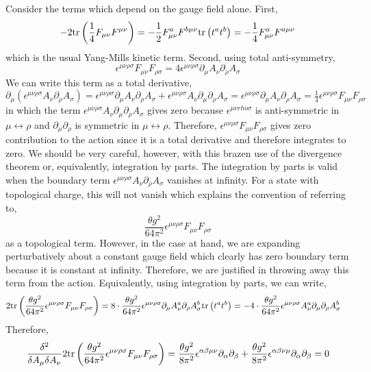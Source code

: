\documentclass[12pt]{article}
\begin{document}
Consider the terms which depend on the gauge field alone. First,
\[ - 2 \mathrm{tr} \left(  \frac{1}{4} F_{\mu \nu} F^{\mu \nu} \right) = -\frac{1}{2} F_{\mu\nu}^a F^{b \mu \nu} \mathrm{tr} \left( t^a t^b \right) = - \frac{1}{4} F_{\mu \nu}^a F^{a \mu \nu}  \]
which is the usual Yang-Mills kinetic term. 
Second, using total anti-symmetry,
\[ \epsilon^{\mu \nu \rho \sigma} F_{\mu \nu} F_{\rho \sigma} = 4 \epsilon^{\mu \nu \rho \sigma} \partial_\mu A_{\nu} \partial_\rho A_\sigma \]
We can write this term as a total derivative,
\[  \partial_\mu \left( \epsilon^{\mu \nu \rho \sigma} A_{\nu} \partial_\rho A_\sigma \right) =  \epsilon^{\mu \nu \rho \sigma} \partial_\mu A_{\nu} \partial_\rho A_\sigma + \epsilon^{\mu \nu \rho \sigma} A_{\nu} \partial_\mu \partial_\rho A_\sigma = \epsilon^{\mu \nu \rho \sigma} \partial_\mu A_{\nu} \partial_\rho A_\sigma = \tfrac{1}{4} \epsilon^{\mu \nu \rho \sigma} F_{\mu \nu} F_{\rho \sigma} \]
in which the term $\epsilon^{\mu \nu \rho \sigma} A_{\nu} \partial_\mu \partial_\rho A_\sigma$ gives zero because $\epsilon^{\mu \nu rho \sigma}$ is anti-symmetric in $\mu \leftrightarrow \rho$ and $\partial_\mu \partial_\rho$ is symmetric in $\mu \leftrightarrow \rho$. Therefore, $\epsilon^{\mu \nu \rho \sigma} F_{\mu \nu} F_{\rho \sigma}$ gives zero contribution to the action since it is a total derivative and therefore integrates to zero. We should be very careful, however, with this brazen use of the divergence theorem or, equivalently, integration by parts. The integration by parts is valid when the boundary term $\epsilon^{\mu \nu \rho \sigma} A_\nu \partial_\rho A_\sigma$ vanishes at infinity. For a state with topological charge, this will not vanish which explains the convention of referring to,
\[ \frac{\theta g^2}{64 \pi^2} \epsilon^{\mu \nu \rho \sigma} F_{\mu \nu} F_{\rho \sigma} \]
as a topological term. However, in the case at hand, we are expanding perturbatively about a constant gauge field which clearly has zero boundary term because it is constant at infinity. Therefore, we are justified in throwing away this term from the action. Equivalently, using integration by parts, we can write,
\begin{align*}
2 \mathrm{tr} \left(  \frac{\theta g^2}{64 \pi^2} \epsilon^{\mu \nu \rho \sigma} F_{\mu \nu} F_{\rho \sigma}  \right) & = 8 \cdot \frac{\theta g^2}{64 \pi^2} \epsilon^{\mu \nu \rho \sigma} \partial_\mu A^a_{\nu} \partial_\rho A^b_\sigma \mathrm{tr} \left( t^a t^b \right) = - 4 \cdot \frac{\theta g^2}{64 \pi^2} \epsilon^{\mu \nu \rho \sigma} A^a_{\nu} \partial_\mu \partial_\rho A^b_\sigma 
\end{align*}
Therefore, 
\[ \frac{\delta^2}{\delta A_\mu \delta A_\nu} 2 \mathrm{tr} \left(  \frac{\theta g^2}{64 \pi^2} \epsilon^{\mu \nu \rho \sigma} F_{\mu \nu} F_{\rho \sigma}  \right) =  \frac{\theta g^2}{8 \pi^2} \epsilon^{\alpha \beta \mu \nu} \partial_{\alpha} \partial_{\beta} + \frac{\theta g^2}{8 \pi^2} \epsilon^{\alpha \beta \nu \mu} \partial_{\alpha} \partial_{\beta} = 0 \]
\end{document}

